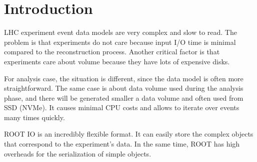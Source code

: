 \section{Introduction}
\label{sec:introduction}

LHC experiment event data models are very complex and slow to read. The problem is that experiments do not care because input I/O time is minimal compared to the reconstruction process. Another critical factor is that experiments care about volume because they have lots of expensive disks.

For analysis case, the situation is different, since the data model is often more straightforward. The same case is about data volume used during the analysis phase, and there will be generated smaller a data volume and often used from SSD (NVMe). It causes minimal CPU costs and allows to iterate over events many times quickly. 

ROOT IO is an incredibly flexible format. It can easily store the complex objects that correspond to the experiment’s data. In the same time, ROOT has high overheads for the serialization of simple objects.

